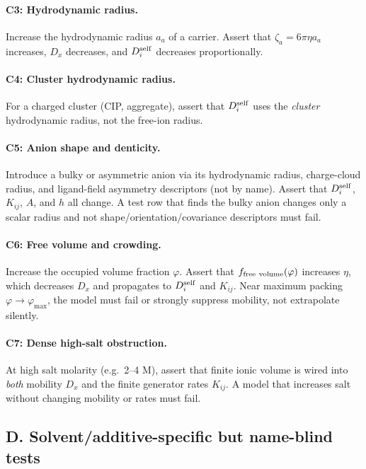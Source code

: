 \documentclass[11pt]{article}
\begin{document}
\paragraph{C3: Hydrodynamic radius.}
Increase the hydrodynamic radius \(a_a\) of a carrier. Assert that
\(\zeta_a=6\pi\eta a_a\) increases, \(D_x\) decreases, and \(D_i^{\rm self}\)
decreases proportionally.

\paragraph{C4: Cluster hydrodynamic radius.}
For a charged cluster (CIP, aggregate), assert that \(D_i^{\rm self}\) uses the
\emph{cluster} hydrodynamic radius, not the free-ion radius.

\paragraph{C5: Anion shape and denticity.}
Introduce a bulky or asymmetric anion via its hydrodynamic radius, charge-cloud
radius, and ligand-field asymmetry descriptors (not by name).
Assert that \(D_i^{\rm self}\), \(K_{ij}\), \(A\), and \(h\) all change.
A test row that finds the bulky anion changes only a scalar radius and
not shape/orientation/covariance descriptors must fail.

\paragraph{C6: Free volume and crowding.}
Increase the occupied volume fraction \(\varphi\). Assert that
\(f_{\rm free\ volume}(\varphi)\) increases \(\eta\), which decreases
\(D_x\) and propagates to \(D_i^{\rm self}\) and \(K_{ij}\).
Near maximum packing \(\varphi\to\varphi_{\max}\), the model must fail or
strongly suppress mobility, not extrapolate silently.

\paragraph{C7: Dense high-salt obstruction.}
At high salt molarity (e.g.\ 2--4 M), assert that finite ionic volume is
wired into \emph{both} mobility \(D_x\) and the finite generator rates
\(K_{ij}\). A model that increases salt without changing mobility or rates
must fail.

\subsection{D. Solvent/additive-specific but name-blind tests}
\end{document}
